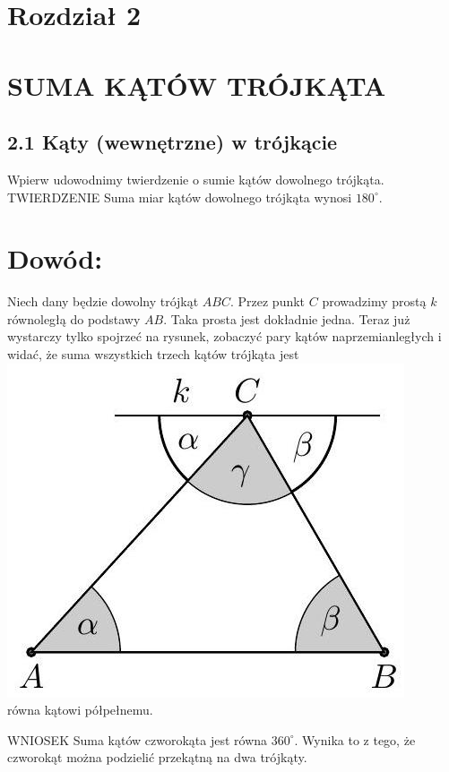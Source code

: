 \documentclass[10pt]{article}
\begin{document}
\section*{Rozdział 2}
\section*{SUMA KĄTÓW TRÓJKĄTA}
\subsection*{2.1 Kąty (wewnętrzne) w trójkącie}
Wpierw udowodnimy twierdzenie o sumie kątów dowolnego trójkąta.\\
TWIERDZENIE Suma miar kątów dowolnego trójkąta wynosi \(180^{\circ}\).

\section*{Dowód:}
Niech dany będzie dowolny trójkąt \(A B C\). Przez punkt \(C\) prowadzimy prostą \(k\) równoległą do podstawy \(A B\). Taka prosta jest dokładnie jedna. Teraz już wystarczy tylko spojrzeć na rysunek, zobaczyć pary kątów naprzemianległych i widać, że suma wszystkich trzech kątów trójkąta jest\\
\includegraphics[max width=\textwidth, center]{2024_11_21_71f62bd117d375398909g-017}\\
równa kątowi półpełnemu.

WNIOSEK Suma kątów czworokąta jest równa \(360^{\circ}\). Wynika to z tego, że czworokąt można podzielić przekątną na dwa trójkąty.
\end{document}
